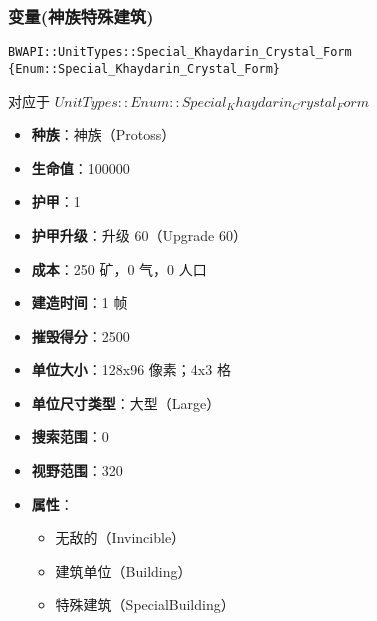 \subsubsection{变量(神族特殊建筑)}

\begin{tcolorbox}[colback=white, colframe=black!60!white, title=Special\_Khaydarin\_Crystal\_Form(), arc=0mm]
    \begin{verbatim}
BWAPI::UnitTypes::Special_Khaydarin_Crystal_Form {Enum::Special_Khaydarin_Crystal_Form}
    \end{verbatim}
    对应于  $ UnitTypes::Enum::Special_Khaydarin_Crystal_Form $ 
    \begin{itemize}
        \item \textbf{种族}：神族（Protoss）
        \item \textbf{生命值}：100000
        \item \textbf{护甲}：1
        \item \textbf{护甲升级}：升级 60（Upgrade 60）
        \item \textbf{成本}：250 矿，0 气，0 人口
        \item \textbf{建造时间}：1 帧
        \item \textbf{摧毁得分}：2500
        \item \textbf{单位大小}：128x96 像素；4x3 格
        \item \textbf{单位尺寸类型}：大型（Large）
        \item \textbf{搜索范围}：0
        \item \textbf{视野范围}：320
        \item \textbf{属性}：
            \begin{itemize}
                \item 无敌的（Invincible）
                \item 建筑单位（Building）
                \item 特殊建筑（SpecialBuilding）
            \end{itemize}
    \end{itemize}
\end{tcolorbox}

